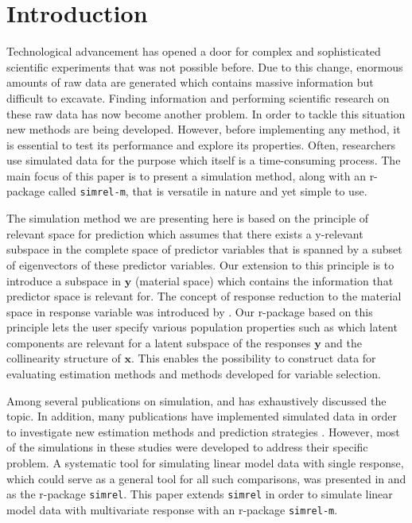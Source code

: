 \documentclass[3p,times,12pt,authoryear]{elsarticle}
\theoremstyle{definition}
\theoremstyle{definition}
\theoremstyle{remark}
\begin{document}
\section{Introduction}\label{introduction}

Technological advancement has opened a door for complex and
sophisticated scientific experiments that was not possible before. Due
to this change, enormous amounts of raw data are generated which
contains massive information but difficult to excavate. Finding
information and performing scientific research on these raw data has now
become another problem. In order to tackle this situation new methods
are being developed. However, before implementing any method, it is
essential to test its performance and explore its properties. Often,
researchers use simulated data for the purpose which itself is a
time-consuming process. The main focus of this paper is to present a
simulation method, along with an r-package called \texttt{simrel-m},
that is versatile in nature and yet simple to use.

The simulation method we are presenting here is based on the principle
of relevant space for prediction \citep{helland1994comparison} which
assumes that there exists a y-relevant subspace in the complete space of
predictor variables that is spanned by a subset of eigenvectors of these
predictor variables. Our extension to this principle is to introduce a
subspace in \(\mathbf{y}\) (material space) which contains the
information that predictor space is relevant for. The concept of
response reduction to the material space in response variable was
introduced by \citet{cook2010envelope}. Our r-package based on this
principle lets the user specify various population properties such as
which latent components are relevant for a latent subspace of the
responses \(\mathbf{y}\) and the collinearity structure of
\(\mathbf{x}\). This enables the possibility to construct data for
evaluating estimation methods and methods developed for variable
selection.

Among several publications on simulation, \citet{ripley2009stochastic}
and \citet{gamerman2006markov} has exhaustively discussed the topic. In
addition, many publications have implemented simulated data in order to
investigate new estimation methods and prediction strategies
\citep[see:][]{cook2015simultaneous, cook2013envelopes, helland2012near}.
However, most of the simulations in these studies were developed to
address their specific problem. A systematic tool for simulating linear
model data with single response, which could serve as a general tool for
all such comparisons, was presented in \citet{saebo2015simrel} and as
the r-package \texttt{simrel}. This paper extends \texttt{simrel} in
order to simulate linear model data with multivariate response with an
r-package \texttt{simrel-m}.
\end{document}
